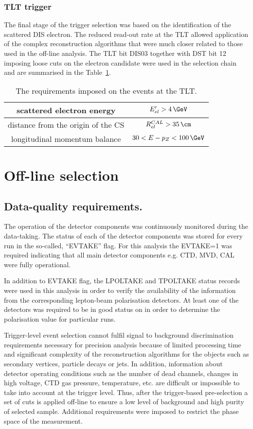 \subsubsection{TLT trigger}
\label{subsec:tltcuts}
The final stage of the trigger selection was based on the identification of the scattered DIS electron. The reduced read-out rate at the TLT allowed application of the complex reconstruction algorithms that were much closer related to those used in the off-line analysis. The TLT bit \textsf{DIS03} together with DST bit 12 imposing loose cuts on the electron candidate were used in the selection chain and are summarised in the Table~\ref{tab:TLTDSTreq}.
\begin{table}[ht!]
\centering
\begin{tabular}{c|c}
\hline scattered electron energy & $E'_{el}>4\,\GeV$ \\ 
\hline distance from the origin of the CS  & $R_{el}^{CAL}>35\,\cm$ \\ 
\hline longitudinal momentum balance & $30<E-p_Z<100\,\GeV$\\
\hline 
\end{tabular} 
\caption{The requirements imposed on the events at the TLT.}
\label{tab:TLTDSTreq}
\end{table}

\section{Off-line selection}
\label{sec:offlineselect}

\subsection{Data-quality requirements.}
The operation of the detector components was continuously monitored during the data-taking. The status of each of the detector components was stored for every run in the so-called, ``EVTAKE'' flag. For this analysis the EVTAKE=1 was required indicating that all main detector components e.g. CTD, MVD, CAL were fully operational.

In addition to EVTAKE flag, the LPOLTAKE and TPOLTAKE status records were used in this analysis in order to verify the availability of the information from the corresponding lepton-beam polarisation detectors. At least one of the detectors was required to be in good status on in order to determine the polarisation value for particular runs.

Trigger-level event selection cannot fulfil signal to background discrimination requirements necessary for precision analysis because of limited processing time and significant complexity of the reconstruction algorithms for the objects such as secondary vertices, particle decays or jets. In addition, information about detector operating conditions such as the number of dead channels, changes in high voltage, CTD gas pressure, temperature, etc. are difficult or impossible to take into account at the trigger level. Thus, after the trigger-based pre-selection a set of cuts is applied off-line to ensure a low level of background and high purity of selected sample. Additional requirements were imposed to restrict the phase space of the measurement. 


